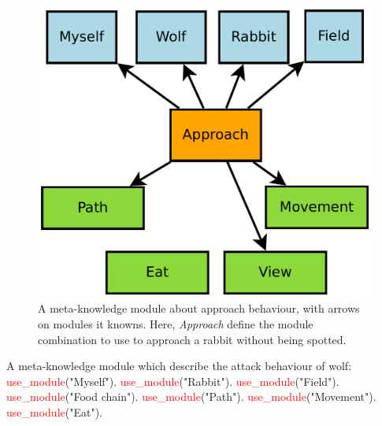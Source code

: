 \documentclass{aamas2012}
\begin{document}
	\begin{figure}
		\centering
		\includegraphics[keepaspectratio=true, scale=0.3]{approach_behaviour.pdf}
		\caption
		{
			\label{approach_figure}
			A meta-knowledge module about approach behaviour, with arrows on modules it knowns.
			Here, \textit{Approach} define the module combination to use to approach a rabbit without being spotted.
		}
	\end{figure}
	
	\begin{example}
		\label{approach_example}
		A meta-knowledge module which describe the attack behaviour of wolf:\newline
		\newline
		\textcolor{red}{use\_module}("Myself").\newline
		\textcolor{red}{use\_module}("Rabbit").\newline
		\textcolor{red}{use\_module}("Field").\newline
		\textcolor{red}{use\_module}("Food chain").\newline
		\textcolor{red}{use\_module}("Path").\newline
		\textcolor{red}{use\_module}("Movement").\newline
		\textcolor{red}{use\_module}("Eat").
	\end{example}
	
\end{document}
